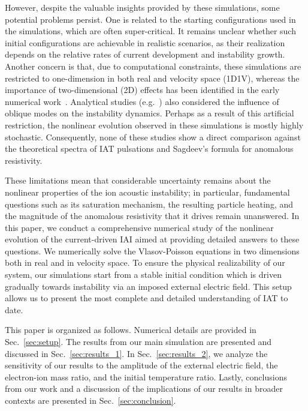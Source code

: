 \documentclass[%
 reprint,
 amsmath,
 amssymb,
 aps,
 prx,
floatfix,
superscriptaddress
]{revtex4-2}
\begin{document}
However, despite the valuable insights provided by these simulations, some potential problems persist. 
One is related to the starting configurations used in the simulations, which are often super-critical. 
It remains unclear whether such initial configurations are achievable in realistic scenarios, as their realization depends on the relative rates of current development and instability growth.
Another concern is that, due to computational constraints, these simulations are restricted to one-dimension in both real and velocity space (1D1V), whereas the importance of two-dimensional (2D) effects has been identified in the early numerical work~\cite{biskamp1971computer}.
Analytical studies (e.g.~\cite{zavoiski1967turbulant,sagdeev1969nonlinear}) also considered the influence of oblique modes on the instability dynamics.
Perhaps as a result of this artificial restriction, the nonlinear evolution observed in these simulations is mostly highly stochastic. 
Consequently, none of these studies show a direct comparison against the theoretical spectra of IAT pulsations and Sagdeev's formula for anomalous resistivity. 

These limitations mean that considerable uncertainty remains about the nonlinear properties of the ion acoustic instability; in particular, fundamental questions such as its saturation mechanism, the resulting particle heating, and the magnitude of the anomalous resistivity that it drives remain unanswered. 
In this paper, we conduct a comprehensive numerical study of the nonlinear evolution of the current-driven IAI aimed at providing detailed answers to these questions. 
We numerically solve the Vlasov-Poisson equations in two dimensions both in real and in velocity space.
To ensure the physical realizability of our system, our simulations start from a stable initial condition which is driven gradually towards instability via an imposed external electric field. 
This setup allows us to present the most complete and detailed understanding of IAT to date.

This paper is organized as follows.
Numerical details are provided in Sec.~\ref{sec:setup}. 
The results from our main simulation are presented and discussed in Sec.~\ref{sec:results_1}. 
In Sec.~\ref{sec:results_2}, we analyze the sensitivity of our results to the amplitude of the external electric field, the electron-ion mass ratio,  and the initial temperature ratio. Lastly, conclusions from our work and a discussion of the implications of our results in broader contexts are presented in Sec.~\ref{sec:conclusion}.
\end{document}
